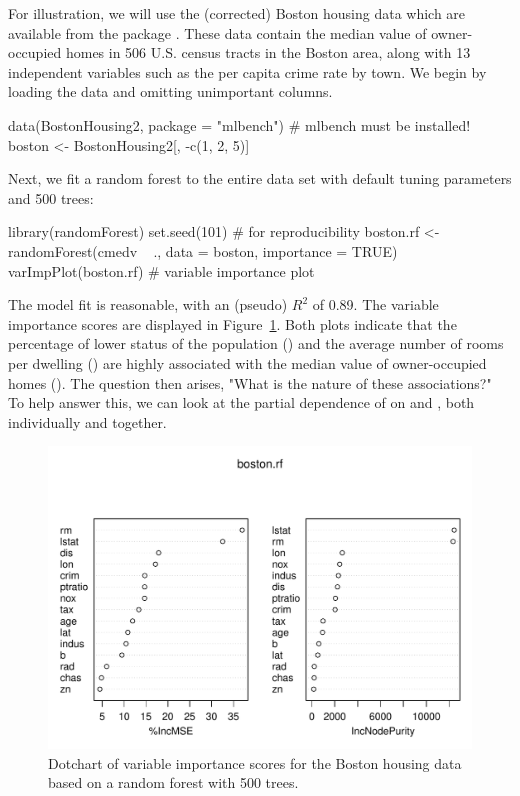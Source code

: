 For illustration, we will use the (corrected) Boston housing data which are available from the  package \citep{mlbench-pkg}. These data contain the median value of owner-occupied homes in 506 U.S. census tracts in the Boston area, along with 13 independent variables such as the per capita crime rate by town. We begin by loading the data and omitting unimportant columns.
\begin{example}
data(BostonHousing2, package = "mlbench")  # mlbench must be installed!
boston <- BostonHousing2[, -c(1, 2, 5)]
\end{example}
Next, we fit a random forest to the entire data set with default tuning parameters and 500 trees:
\begin{example}
library(randomForest)
set.seed(101)  # for reproducibility
boston.rf <- randomForest(cmedv ~ ., data = boston, importance = TRUE)
varImpPlot(boston.rf)  # variable importance plot
\end{example}
The model fit is reasonable, with an  (pseudo) $R^2$ of 0.89. The variable importance scores are displayed in Figure~\ref{fig:plotmo_vs_partial}. Both plots indicate that the percentage of lower status of the population () and the average number of rooms per dwelling () are highly associated with the median value of owner-occupied homes (). The question then arises, "What is the nature of these associations?" To help answer this, we can look at the partial dependence of  on  and , both individually and together.

\begin{figure}[!htbp]
  \centering
  \includegraphics[width=1.0\linewidth]{boston_rf_vimp}
  \caption{Dotchart of variable importance scores for the Boston housing data based on a random forest with 500 trees.}
  \label{fig:plotmo_vs_partial}
\end{figure}


